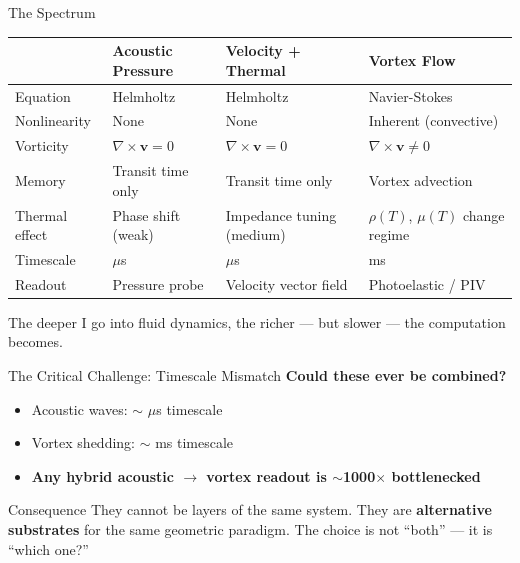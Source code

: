 \documentclass[aspectratio=169,11pt]{beamer}
\begin{document}
\begin{frame}{The Spectrum}
  \footnotesize
  \begin{table}
    \centering
    \renewcommand{\arraystretch}{1.05}
    \begin{tabular}{@{}>{\raggedright}p{3.0cm}>{\raggedright}p{3.3cm}>{\raggedright}p{3.3cm}>{\raggedright\arraybackslash}p{3.9cm}@{}}
      \toprule
      & \textbf{Acoustic Pressure} & \textbf{Velocity + Thermal} & \textbf{Vortex Flow} \\
      \midrule
      Equation & Helmholtz & Helmholtz & Navier-Stokes \\
      Nonlinearity & None & None & Inherent (convective) \\
      Vorticity & $\nabla \times \mathbf{v} = 0$ & $\nabla \times \mathbf{v} = 0$ & $\nabla \times \mathbf{v} \neq 0$ \\
      Memory & Transit time only & Transit time only & Vortex advection \\
      Thermal effect & Phase shift (weak) & Impedance tuning (medium) & $\rho(T)$, $\mu(T)$ change regime \\
      Timescale & $\mu$s & $\mu$s & ms \\
      Readout & Pressure probe & Velocity vector field & Photoelastic / PIV \\
      \bottomrule
    \end{tabular}
  \end{table}

  \vspace{0.2cm}
  \textcolor{gdpBurgundy}{\small The deeper I go into fluid dynamics, the richer --- but slower --- the computation becomes.}
\end{frame}

\begin{frame}{The Critical Challenge: Timescale Mismatch}
  \textbf{Could these ever be combined?}

  \vspace{0.2cm}
  \begin{itemize}
    \item Acoustic waves: $\sim$ $\mu$s timescale
    \item Vortex shedding: $\sim$ ms timescale
    \item \textbf{Any hybrid acoustic $\rightarrow$ vortex readout is $\sim$1000$\times$ bottlenecked}
  \end{itemize}

  \vspace{0.3cm}
  \begin{block}{\footnotesize Consequence}
    \footnotesize
    They cannot be layers of the same system. They are \textbf{alternative substrates} for the same geometric paradigm. The choice is not ``both'' --- it is ``which one?''
  \end{block}
\end{frame}
\end{document}
